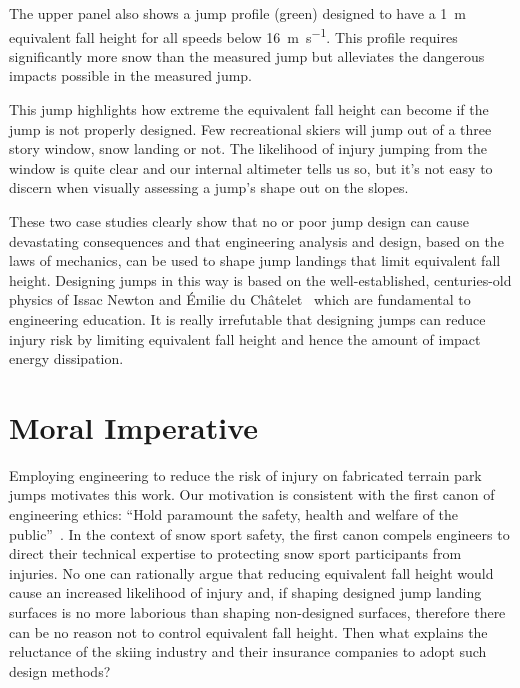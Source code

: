 \documentclass[smallextended]{svjour3}       %
\begin{document}
The upper panel also shows a jump profile (green) designed to have a
1~\si{\meter} equivalent fall height for all speeds below
16~\si{\meter\per\second}. This profile requires significantly more snow than
the measured jump but alleviates the dangerous impacts possible in the measured
jump.

This jump highlights how extreme the equivalent fall height can become if the jump
is not properly designed. Few recreational skiers will jump out of a three
story window, snow landing or not. The likelihood of injury jumping from the window is quite clear and
our internal altimeter tells us so, but it's not easy to discern when visually assessing a jump's shape out on the slopes.

These two case studies clearly show that no or poor jump design can cause
devastating consequences and that engineering analysis and design, based on the
laws of mechanics, can be used to shape jump landings that limit equivalent
fall height. Designing jumps in this way is based on the well-established,
centuries-old physics of Issac Newton and Émilie du Châtelet~\cite{Zinsser2007}
which are fundamental to engineering education. It is really irrefutable that
designing jumps can reduce injury risk by limiting equivalent fall height and
hence the amount of impact energy dissipation.

\section{Moral Imperative}
\label{sec:moral}
%
Employing engineering to reduce the risk of injury on fabricated terrain park
jumps motivates this work. Our motivation is consistent with the first canon of
engineering ethics: ``Hold paramount the safety, health and welfare of the
public''~\cite{NSPE2019}. In the context of snow sport safety, the first canon
compels engineers to direct their technical expertise to protecting snow sport
participants from injuries. No one can rationally argue that reducing
equivalent fall height would cause an increased likelihood of injury and, if
shaping designed jump landing surfaces is no more laborious than shaping
non-designed surfaces, therefore there can be no reason not to control
equivalent fall height. Then what explains the reluctance of the skiing
industry and their insurance companies to adopt such design methods?
\end{document}
